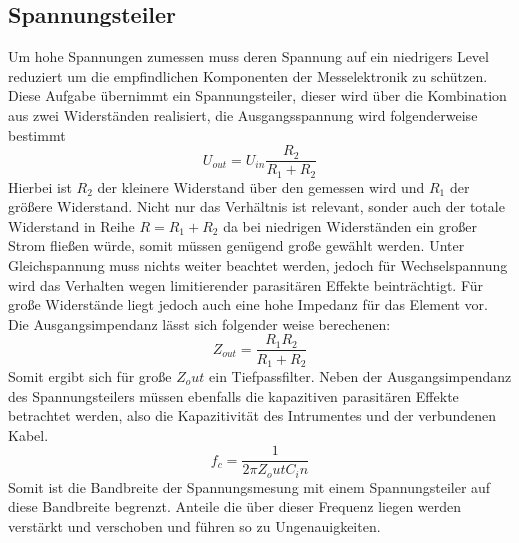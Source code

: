 \subsection{Spannungsteiler}
\label{sec:voltagedividertheo}
Um hohe Spannungen zumessen muss deren Spannung auf ein niedrigers Level reduziert um die empfindlichen Komponenten der Messelektronik zu schützen. Diese Aufgabe übernimmt ein Spannungsteiler, dieser wird über die Kombination aus zwei Widerständen realisiert, die Ausgangsspannung wird folgenderweise bestimmt
\begin{equation}
    U_{out} = U_{in} \frac{R_2}{R_1 + R_2}
    \label{eq:voltagedivider}
\end{equation}
Hierbei ist \(R_2\) der kleinere Widerstand über den gemessen wird und \(R_1\) der größere Widerstand. Nicht nur das Verhältnis ist relevant, sonder auch der totale Widerstand in Reihe \(R = R_1 + R_2\) da bei niedrigen Widerständen ein großer Strom fließen würde, somit müssen genügend große gewählt werden. Unter Gleichspannung muss nichts weiter beachtet werden, jedoch für Wechselspannung wird das Verhalten wegen limitierender parasitären Effekte beinträchtigt. Für große Widerstände liegt jedoch auch eine hohe Impedanz für das Element vor. Die Ausgangsimpendanz lässt sich folgender weise berechenen:
\begin{equation}
    Z_{out} = \frac{R_1 R_2}{R_1 + R_2}
    \label{eq:voltagedividerimp}
\end{equation}
Somit ergibt sich für große \(Z_out\) ein Tiefpassfilter. Neben der Ausgangsimpendanz des Spannungsteilers müssen ebenfalls die kapazitiven parasitären Effekte betrachtet werden, also die Kapazitivität des Intrumentes und der verbundenen Kabel.
\begin{equation}
    f_c = \frac{1}{2\pi Z_out C_in}
    \label{eq: voltagedividerfreq}
\end{equation}
Somit ist die Bandbreite der Spannungsmesung mit einem Spannungsteiler auf diese Bandbreite begrenzt. Anteile die über dieser Frequenz liegen werden verstärkt und verschoben und führen so zu Ungenauigkeiten. 




